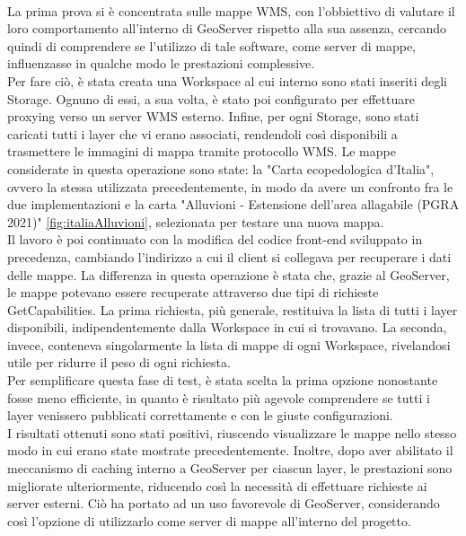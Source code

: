 \\La prima prova si è concentrata sulle mappe WMS, con l'obbiettivo di valutare il loro comportamento all'interno di GeoServer rispetto alla sua assenza, cercando quindi di comprendere se l'utilizzo di tale software, come server di mappe, influenzasse in qualche modo le prestazioni complessive.
\\Per fare ciò, è stata creata una Workspace al cui interno sono stati inseriti degli Storage. Ognuno di essi, a sua volta, è stato poi configurato per effettuare proxying verso un server WMS esterno. Infine, per ogni Storage, sono stati caricati tutti i layer che vi erano associati, rendendoli così disponibili a trasmettere le immagini di mappa tramite protocollo WMS. Le mappe considerate in questa operazione sono state: la "Carta ecopedologica d’Italia", ovvero la stessa utilizzata precedentemente, in modo da avere un confronto fra le due implementazioni e la carta "Alluvioni - Estensione dell'area allagabile (PGRA 2021)" \ref{fig:italiaAlluvioni}, selezionata per testare una nuova mappa.
\\Il lavoro è poi continuato con la modifica del codice front-end sviluppato in precedenza, cambiando l'indirizzo a cui il client si collegava per recuperare i dati delle mappe. La differenza in questa operazione è stata che, grazie al GeoServer, le mappe potevano essere recuperate attraverso due tipi di richieste GetCapabilities. La prima richiesta, più generale, restituiva la lista di tutti i layer disponibili, indipendentemente dalla Workspace in cui si trovavano. La seconda, invece, conteneva singolarmente la lista di mappe di ogni Workspace, rivelandosi utile per ridurre il peso di ogni richiesta.
\\Per semplificare questa fase di test, è stata scelta la prima opzione nonostante fosse meno efficiente, in quanto è risultato più agevole comprendere se tutti i layer venissero pubblicati correttamente e con le giuste configurazioni.
\\I risultati ottenuti sono stati positivi, riuscendo visualizzare le mappe nello stesso modo in cui erano state mostrate precedentemente. Inoltre, dopo aver abilitato il meccanismo di caching interno a GeoServer per ciascun layer, le prestazioni sono migliorate ulteriormente, riducendo così la necessità di effettuare richieste ai server esterni. Ciò ha portato ad un uso favorevole di GeoServer, considerando così l'opzione di utilizzarlo come server di mappe all'interno del progetto.

